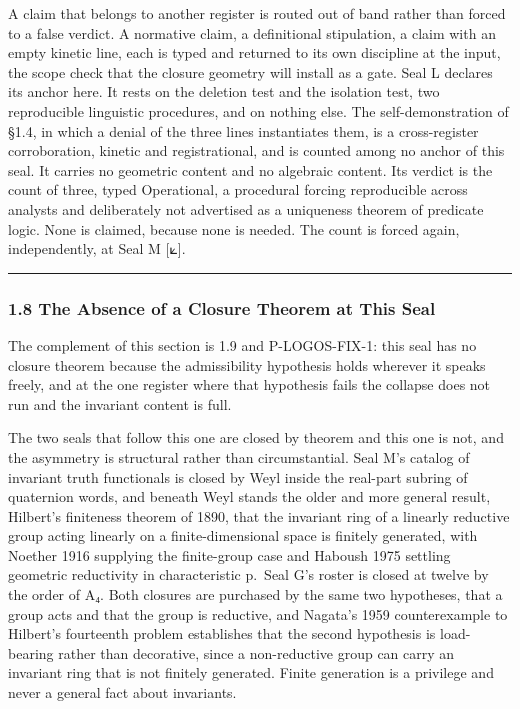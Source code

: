 \documentclass[10pt,twocolumn]{article}
\begin{document}
A claim that belongs to another register is routed out of band rather
than forced to a false verdict. A normative claim, a definitional
stipulation, a claim with an empty kinetic line, each is typed and
returned to its own discipline at the input, the scope check that the
closure geometry will install as a gate. Seal L declares its anchor
here. It rests on the deletion test and the isolation test, two
reproducible linguistic procedures, and on nothing else. The
self-demonstration of §1.4, in which a denial of the three lines
instantiates them, is a cross-register corroboration, kinetic and
registrational, and is counted among no anchor of this seal. It carries
no geometric content and no algebraic content. Its verdict is the count
of three, typed Operational, a procedural forcing reproducible across
analysts and deliberately not advertised as a uniqueness theorem of
predicate logic. None is claimed, because none is needed. The count is
forced again, independently, at Seal M {[}⟀{]}.

\begin{center}\rule{0.5\linewidth}{0.5pt}\end{center}

\hypertarget{the-absence-of-a-closure-theorem-at-this-seal}{%
\subsubsection{1.8 The Absence of a Closure Theorem at This
Seal}\label{the-absence-of-a-closure-theorem-at-this-seal}}

The complement of this section is 1.9 and P-LOGOS-FIX-1: this seal has
no closure theorem because the admissibility hypothesis holds wherever
it speaks freely, and at the one register where that hypothesis fails
the collapse does not run and the invariant content is full.

The two seals that follow this one are closed by theorem and this one is
not, and the asymmetry is structural rather than circumstantial. Seal
M's catalog of invariant truth functionals is closed by Weyl inside the
real-part subring of quaternion words, and beneath Weyl stands the older
and more general result, Hilbert's finiteness theorem of 1890, that the
invariant ring of a linearly reductive group acting linearly on a
finite-dimensional space is finitely generated, with Noether 1916
supplying the finite-group case and Haboush 1975 settling geometric
reductivity in characteristic p.~Seal G's roster is closed at twelve by
the order of A₄. Both closures are purchased by the same two hypotheses,
that a group acts and that the group is reductive, and Nagata's 1959
counterexample to Hilbert's fourteenth problem establishes that the
second hypothesis is load-bearing rather than decorative, since a
non-reductive group can carry an invariant ring that is not finitely
generated. Finite generation is a privilege and never a general fact
about invariants.
\end{document}
